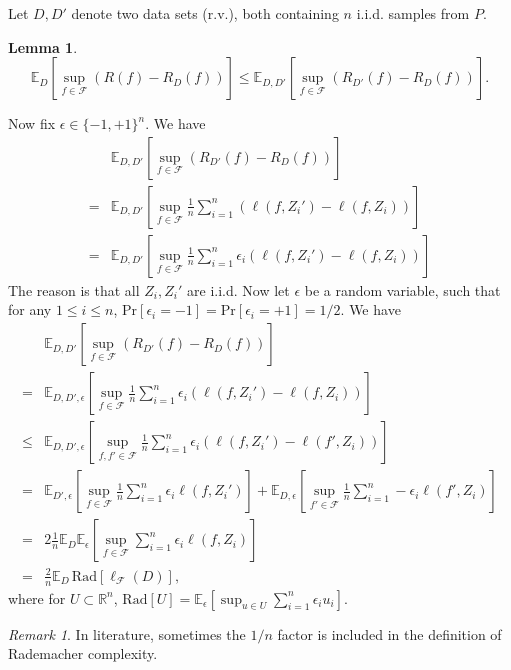 \documentclass[openany]{book}
\newtheorem{lemma}{Lemma}[chapter]
\theoremstyle{definition}
\theoremstyle{remark}
\newtheorem*{remark}{Remark}
\begin{document}
Let $D,D'$ denote two data sets (r.v.), both containing $n$ i.i.d. samples from $P$.
\begin{lemma}
    \begin{equation*}
        \mathbb{E}_{D}\left[\sup_{f\in \mathcal{F}}\left(R(f)-R_{D}(f)\right)\right]\le \mathbb{E}_{D,D'}\left[\sup_{f\in \mathcal{F}}\left(R_{D'}(f)-R_{D}(f)\right)\right].
    \end{equation*}
\end{lemma}
Now fix $\epsilon\in\{-1,+1\}^n$. We have
\begin{equation*}
    \begin{split}
         & \mathbb{E}_{D,D'}\left[\sup_{f\in \mathcal{F}}\left(R_{D'}(f)-R_{D}(f)\right)\right] \\
        = & \mathbb{E}_{D,D'}\left[\sup_{f\in \mathcal{F}}\frac{1}{n}\sum_{i=1}^{n}\left(\ell(f,Z_i')-\ell(f,Z_i)\right)\right] \\
        = & \mathbb{E}_{D,D'}\left[\sup_{f\in \mathcal{F}}\frac{1}{n}\sum_{i=1}^{n}\epsilon_i\left(\ell(f,Z_i')-\ell(f,Z_i)\right)\right]
    \end{split}
\end{equation*}
The reason is that all $Z_i,Z_i'$ are i.i.d. Now let $\epsilon$ be a random variable, such that for any $1\le i\le n$, $\mathrm{Pr}[\epsilon_i=-1]=\mathrm{Pr}[\epsilon_i=+1]=1/2$. We have
\begin{equation*}
    \begin{split}
         & \mathbb{E}_{D,D'}\left[\sup_{f\in \mathcal{F}}\left(R_{D'}(f)-R_{D}(f)\right)\right] \\
        = & \mathbb{E}_{D,D',\epsilon}\left[\sup_{f\in \mathcal{F}}\frac{1}{n}\sum_{i=1}^{n}\epsilon_i\left(\ell(f,Z_i')-\ell(f,Z_i)\right)\right] \\
        \le & \mathbb{E}_{D,D',\epsilon}\left[\sup_{f,f'\in \mathcal{F}}\frac{1}{n}\sum_{i=1}^{n}\epsilon_i\left(\ell(f,Z_i')-\ell(f',Z_i)\right)\right] \\
        = & \mathbb{E}_{D',\epsilon}\left[\sup_{f\in \mathcal{F}}\frac{1}{n}\sum_{i=1}^{n}\epsilon_i\ell(f,Z_i')\right]+\mathbb{E}_{D,\epsilon}\left[\sup_{f'\in \mathcal{F}}\frac{1}{n}\sum_{i=1}^{n}-\epsilon_i\ell(f',Z_i)\right] \\
        = & 2 \frac{1}{n}\mathbb{E}_{D}\mathbb{E}_{\epsilon}\left[\sup_{f\in \mathcal{F}}\sum_{i=1}^{n}\epsilon_i\ell(f,Z_i)\right] \\
        = & \frac{2}{n}\mathbb{E}_{D}\,\mathrm{Rad}\left[\ell_{\mathcal{F}}(D)\right],
    \end{split}
\end{equation*}
where for $U\subset \mathbb{R}^n$, $\mathrm{Rad}[U]=\mathbb{E}_{\epsilon}\left[\sup_{u\in U}\sum_{i=1}^{n}\epsilon_iu_i\right]$.
\begin{remark}
    In literature, sometimes the $1/n$ factor is included in the definition of Rademacher complexity.
\end{remark}
\end{document}
